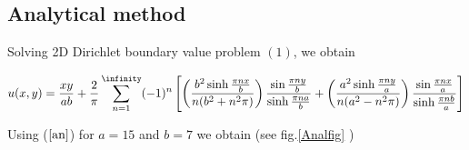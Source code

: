 \subsection*{Analytical method}

Solving 2D Dirichlet  boundary value problem $(1)$, we obtain 

\begin{equation}\label{an}
    u(x,y) = \frac{xy}{ab} + \frac{2}{\pi} \sum_{n=1}^{\infinity}(-1)^n\left[\left(\frac{b^2 \sinh{\frac{\pi n x }{b}}}{n(b^2 + n^2\pi)}\right)\frac{\sin{\frac{\pi n y}{b}}}{\sinh{\frac{\pi n a }{b}}} +  \left(\frac{a^2 \sinh{\frac{\pi n y }{a}}}{n(a^2 - n^2\pi)}\right)\frac{\sin{\frac{\pi n x}{a}}}{\sinh{\frac{\pi n b }{a}}}\right]
\end{equation}

Using ($\ref{an}$)  for $a=15$ and $b=7$ we obtain (see fig.\ref{Analfig} )

